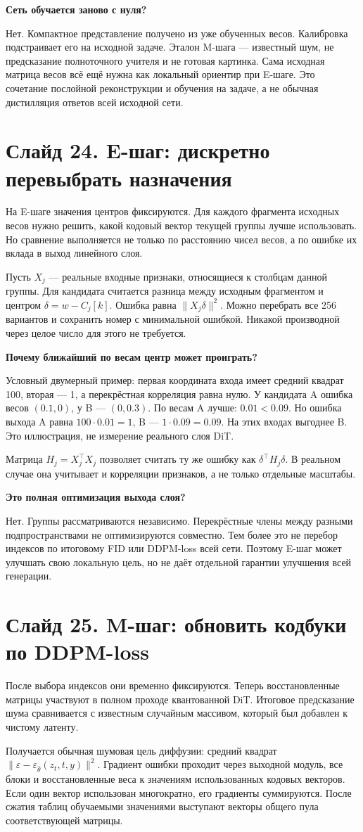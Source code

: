 \documentclass[a4paper,11pt]{article}
\newcommand{\slide}[2]{\clearpage\section*{Слайд #1. #2}}
\newcommand{\question}[1]{\par\textbf{#1}\par}
\begin{document}
\question{Сеть обучается заново с нуля?}
Нет. Компактное представление получено из уже обученных
весов. Калибровка подстраивает его на исходной задаче.
Эталон M-шага --- известный шум, не предсказание
полноточного учителя и не готовая картинка.
Сама исходная матрица весов всё ещё нужна как
локальный ориентир при E-шаге. Это сочетание
послойной реконструкции и обучения на задаче,
а не обычная дистилляция ответов всей исходной сети.

\slide{24}{E-шаг: дискретно перевыбрать назначения}
На E-шаге значения центров фиксируются.
Для каждого фрагмента исходных весов нужно решить,
какой кодовый вектор текущей группы лучше использовать.
Но сравнение выполняется не только по расстоянию чисел
весов, а по ошибке их вклада в выход линейного слоя.

Пусть $X_j$ --- реальные входные признаки,
относящиеся к столбцам данной группы. Для кандидата
считается разница между исходным фрагментом
и центром $\delta=w-C_j[k]$. Ошибка равна
$\|X_j\delta\|^2$. Можно перебрать все 256
вариантов и сохранить номер с минимальной ошибкой.
Никакой производной через целое число для этого не требуется.

\question{Почему ближайший по весам центр может проиграть?}
Условный двумерный пример: первая координата входа
имеет средний квадрат 100, вторая --- 1,
а перекрёстная корреляция равна нулю.
У кандидата A ошибка весов $(0.1,0)$,
у B --- $(0,0.3)$. По весам A лучше:
$0.01<0.09$. Но ошибка выхода A равна
$100\cdot0.01=1$, B --- $1\cdot0.09=0.09$.
На этих входах выгоднее B. Это иллюстрация,
не измерение реального слоя DiT.

Матрица $H_j=X_j^\top X_j$ позволяет считать
ту же ошибку как $\delta^\top H_j\delta$.
В реальном случае она учитывает и корреляции признаков,
а не только отдельные масштабы.

\question{Это полная оптимизация выхода слоя?}
Нет. Группы рассматриваются независимо.
Перекрёстные члены между разными подпространствами
не оптимизируются совместно. Тем более это не
перебор индексов по итоговому FID или DDPM-loss всей сети.
Поэтому E-шаг может улучшать свою локальную цель,
но не даёт отдельной гарантии улучшения всей генерации.

\slide{25}{M-шаг: обновить кодбуки по DDPM-loss}
После выбора индексов они временно фиксируются.
Теперь восстановленные матрицы участвуют в полном
проходе квантованной DiT. Итоговое предсказание
шума сравнивается с известным случайным массивом,
который был добавлен к чистому латенту.

Получается обычная шумовая цель диффузии:
средний квадрат $\|\varepsilon-\varepsilon_{\widehat\theta}(z_t,t,y)\|^2$.
Градиент ошибки проходит через выходной модуль,
все блоки и восстановленные веса к значениям
использованных кодовых векторов. Если один вектор
использован многократно, его градиенты суммируются.
После сжатия таблиц обучаемыми значениями выступают
векторы общего пула соответствующей матрицы.
\end{document}
